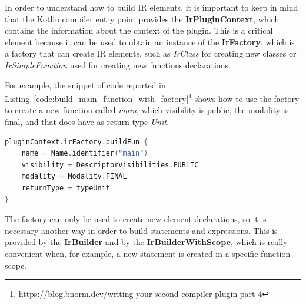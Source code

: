 In order to understand how to build IR elements, it is important to keep in mind that the Kotlin compiler entry point provides the \textbf{IrPluginContext}, which contains the information about the context of the plugin. This is a critical element because it can be used to obtain an instance of the \textbf{IrFactory}, which is a factory that can create IR elements, such as \textit{IrClass} for creating new classes or \textit{IrSimpleFunction} used for creating new functions declarations.

For example, the snippet of code reported in Listing~\ref{code:build_main_function_with_factory}\footnote{\url{https://blog.bnorm.dev/writing-your-second-compiler-plugin-part-4}} shows how to use the factory to create a new function called \textit{main}, which visibility is public, the modality is final, and that does have as return type \textit{Unit}.
\begin{lstlisting}[caption={Main function IR building by using the IrFactory}, captionpos=b, language=Kotlin, label={code:build_main_function_with_factory}]
pluginContext.irFactory.buildFun {
    name = Name.identifier("main")
    visibility = DescriptorVisibilities.PUBLIC
    modality = Modality.FINAL
    returnType = typeUnit
}        
\end{lstlisting}

The factory can only be used to create new element declarations, so it is necessary another way in order to build statements and expressions. This is provided by the \textbf{IrBuilder} and by the \textbf{IrBuilderWithScope}, which is really convenient when, for example, a new statement is created in a specific function scope.

